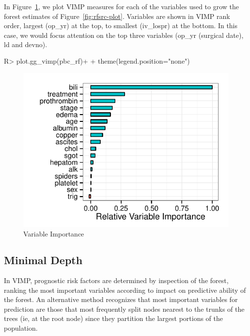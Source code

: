 \documentclass[nojss]{jss}\usepackage[]{graphicx}\usepackage[]{color}
\makeatletter
\def\maxwidth{ %
  \ifdim\Gin@nat@width>\linewidth
    \linewidth
  \else
    \Gin@nat@width
  \fi
}
\makeatother
\begin{document}
In Figure~\ref{fig:rf-vimp}, we plot VIMP measures for each of the variables used to grow the forest estimates of Figure~\ref{fig:rfsrc-plot}. Variables are shown in VIMP rank order, largest (op\_yr) at the top, to smallest (iv\_lospr) at the bottom. In this case, we would focus attention on the top three variables (op\_yr (surgical date), ld and devno).
\begin{Schunk}
\begin{Sinput}
R> plot.gg_vimp(pbc_rf)+
+   theme(legend.position="none")
\end{Sinput}
\begin{figure}[!htpb]

{\centering \includegraphics[width=\maxwidth]{figure/rfs-rf-vimp-1} 

}

\caption[Variable Importance]{Variable Importance\label{fig:rf-vimp}}
\end{figure}
\end{Schunk}

\subsection{Minimal Depth}\label{S:minimalDepth}
In VIMP, prognostic risk factors are determined by inspection of the forest, ranking the most important variables according to impact on predictive ability of the forest. An alternative method recognizes that most important variables for prediction are those that most frequently split nodes nearest to the trunks of the trees (ie, at the root node) since they partition the largest portions of the population. 
\end{document}
